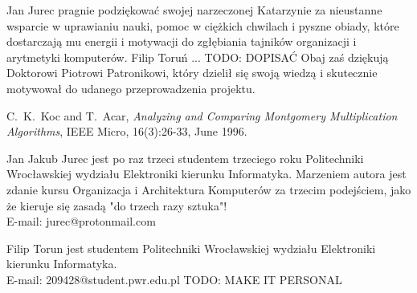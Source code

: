 \documentclass[10pt,journal,compsoc]{IEEEtran}
\begin{document}
Jan Jurec pragnie podziękować swojej narzeczonej Katarzynie za nieustanne wsparcie w uprawianiu nauki, pomoc w ciężkich chwilach i pyszne obiady, które dostarczają mu energii i motywacji do zgłębiania tajników organizacji i arytmetyki komputerów.
Filip Toruń ... TODO: DOPISAĆ
Obaj zaś dziękują Doktorowi Piotrowi Patronikowi, który dzielił się swoją wiedzą i skutecznie motywował do udanego przeprowadzenia projektu.

\begin{thebibliography}{1}

C.~K.~Koc and T.~Acar, \emph{Analyzing and Comparing Montgomery Multiplication Algorithms}, IEEE Micro, 16(3):26-33, June 1996.

\end{thebibliography}
\begin{IEEEbiography}{Jan Jakub Jurec} jest po raz trzeci studentem trzeciego roku Politechniki Wrocławskiej wydziału Elektroniki kierunku Informatyka. Marzeniem autora jest zdanie kursu Organizacja i Architektura Komputerów za trzecim podejściem, jako że kieruje się zasadą "do trzech razy sztuka"! \\
E-mail: jurec@protonmail.com
\end{IEEEbiography}


\begin{IEEEbiography}{Filip Torun}
jest studentem Politechniki Wrocławskiej wydziału Elektroniki kierunku Informatyka. \\
E-mail: 209428@student.pwr.edu.pl
TODO: MAKE IT PERSONAL
\end{IEEEbiography}

\vfill
\end{document}
